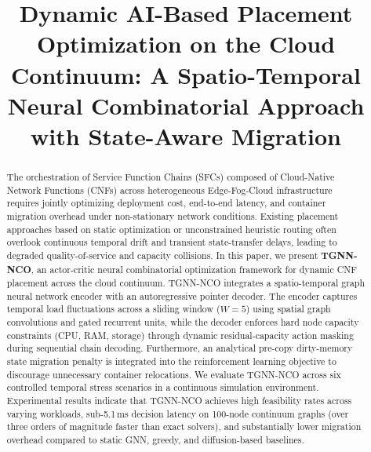 \documentclass[conference]{IEEEtran}
\begin{document}
\title{Dynamic AI-Based Placement Optimization on the Cloud Continuum: A Spatio-Temporal Neural Combinatorial Approach with State-Aware Migration}

\author{
\and
{}
\and
{}
}

\maketitle

\begin{abstract}
The orchestration of Service Function Chains (SFCs) composed of Cloud-Native Network Functions (CNFs) across heterogeneous Edge-Fog-Cloud infrastructure requires jointly optimizing deployment cost, end-to-end latency, and container migration overhead under non-stationary network conditions. Existing placement approaches based on static optimization or unconstrained heuristic routing often overlook continuous temporal drift and transient state-transfer delays, leading to degraded quality-of-service and capacity collisions. In this paper, we present \textbf{TGNN-NCO}, an actor-critic neural combinatorial optimization framework for dynamic CNF placement across the cloud continuum. TGNN-NCO integrates a spatio-temporal graph neural network encoder with an autoregressive pointer decoder. The encoder captures temporal load fluctuations across a sliding window ($W=5$) using spatial graph convolutions and gated recurrent units, while the decoder enforces hard node capacity constraints (CPU, RAM, storage) through dynamic residual-capacity action masking during sequential chain decoding. Furthermore, an analytical pre-copy dirty-memory state migration penalty is integrated into the reinforcement learning objective to discourage unnecessary container relocations. We evaluate TGNN-NCO across six controlled temporal stress scenarios in a continuous simulation environment. Experimental results indicate that TGNN-NCO achieves high feasibility rates across varying workloads, sub-5.1\,ms decision latency on 100-node continuum graphs (over three orders of magnitude faster than exact solvers), and substantially lower migration overhead compared to static GNN, greedy, and diffusion-based baselines.
\end{abstract}
\end{document}
